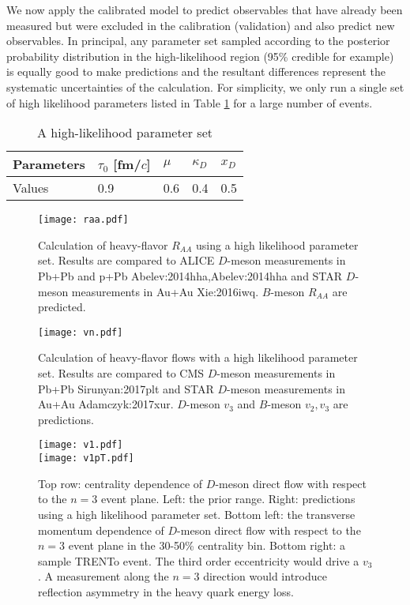 We now apply the calibrated model to predict observables that have already been measured but were excluded in the calibration (validation) and also predict new observables.
In principal, any parameter set sampled according to the posterior probability distribution in the high-likelihood region (95\% credible for example) is equally good to make predictions and the resultant differences represent the systematic uncertainties of the calculation.
For simplicity, we only run a single set of high likelihood parameters listed in Table \ref{table:high-likelihood-parameters} for a large number of events.
\begin{table}
\caption{A high-likelihood parameter set}\label{table:high-likelihood-parameters}
\begin{tabularx}{\columnwidth}{XXXXX}
\hline
Parameters & $\tau_0$ [fm/$c$] & $\mu$ & $\kappa_D$ & $x_D$   \\
\hline
Values & 0.9 & 0.6 & 0.4 & 0.5\\
\hline
\end{tabularx}
\end{table} 
\begin{figure*}
\texttt{[image: raa.pdf]}
\caption{Calculation of heavy-flavor $R_{AA}$ using a high likelihood parameter set. Results are compared to ALICE $D$-meson measurements in Pb+Pb and p+Pb {Abelev:2014hha,Abelev:2014hha} and STAR $D$-meson measurements in Au+Au {Xie:2016iwq}. $B$-meson $R_{AA}$ are predicted.}\label{plots:pred:raa}
\end{figure*}
\begin{figure*}
\texttt{[image: vn.pdf]}
\caption{Calculation of heavy-flavor flows with a high likelihood parameter set. Results are compared to CMS $D$-meson measurements in Pb+Pb {Sirunyan:2017plt} and STAR $D$-meson measurements in Au+Au {Adamczyk:2017xur}. $D$-meson $v_3$ and $B$-meson $v_2, v_3$ are predictions.}\label{plots:pred:vn}
\end{figure*}
\begin{figure}
\texttt{[image: v1.pdf]}\\
\texttt{[image: v1pT.pdf]}
\caption{Top row: centrality dependence of $D$-meson direct flow with respect to the $n=3$ event plane. Left: the prior range. Right: predictions using a high likelihood parameter set. Bottom left: the transverse momentum dependence of $D$-meson direct flow with respect to the $n=3$ event plane in the 30-50\% centrality bin. Bottom right: a sample TRENTo event. The third order eccentricity would drive a $v_3$. A measurement along the $n=3$ direction would introduce reflection asymmetry in the heavy quark energy loss.}\label{plots:pred:v1}
\end{figure}
